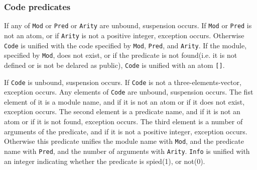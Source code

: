 \subsubsection{Code predicates}
\begin{itemize}

If any of \verb|Mod| or \verb|Pred| or \verb|Arity| are unbound,
suspension occurs.
If \verb|Mod| or \verb|Pred| is not an atom, or 
if \verb|Arity| is not a positive integer, exception occurs.
Otherwise \verb|Code| is unified with the code specified by \verb|Mod|,
\verb|Pred|, and \verb|Arity|.
If the module, specified by \verb|Mod|, does not exist,
or if the predicate is not found(i.e. it is not defined or is not be delared
as public), \verb|Code| is unified with an atom \verb|[]|.

If \verb|Code| is unbound, suspension occurs.
If \verb|Code| is not a three-elements-vector, exception occurs.
Any elements of \verb|Code| are unbound, suspension occurs.
The fist element of it is a module name, and if it is not an atom or if it does
not exist, exception occurs.
The second element is a predicate name, and if it is not an atom or if it is
not found, exception occurs.
The third element is a number of arguments of the predicate,
and if it is not a positive integer, exception occurs.
Otherwise this predicate unifies the module name with \verb|Mod|, and
the predicate name with \verb|Pred|, and the number of arguments with
\verb|Arity|. \verb|Info| is unified with an integer indicating whether
the predicate is spied(1), or not(0).

\end{itemize}
